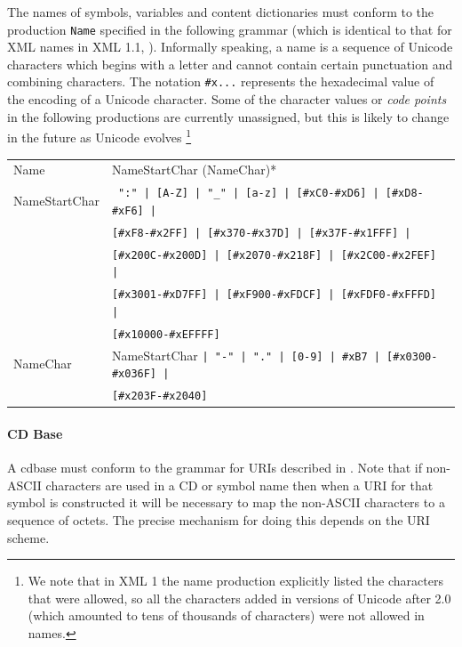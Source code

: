 \documentclass{report}
\def\XML{XML\xspace}
\begin{document}
The names of symbols, variables and content dictionaries must conform to the production
\lstinline|Name| specified in the following grammar (which is identical to that for \XML
names in XML 1.1, \cite{xml_04}). Informally speaking, a name is a sequence of Unicode
\cite{UNICODE} characters which begins with a letter and cannot contain certain
punctuation and combining characters.  The notation \lstinline|#x...| represents the
hexadecimal value of the encoding of a Unicode character.  Some of the character values or
\emph{code points} in the following productions are currently unassigned, but this is
likely to change in the future as Unicode evolves \footnote{\label{xml1} We note that in
  XML 1 the name production explicitly listed the characters that were allowed, so all the
  characters added in versions of Unicode after 2.0 (which amounted to tens of thousands
  of characters) were not allowed in names.}


\begin{center}
\begin{tabular}{l@{$\longrightarrow$}p{10cm}}
Name & NameStartChar (NameChar)* \\
NameStartChar & 
\lstinline? ":" | [A-Z] | "_" | [a-z] | [#xC0-#xD6] | [#xD8-#xF6] |?\\
& \lstinline?[#xF8-#x2FF] | [#x370-#x37D] | [#x37F-#x1FFF] |?\\
& \lstinline?[#x200C-#x200D] | [#x2070-#x218F] | [#x2C00-#x2FEF] |?\\
& \lstinline?[#x3001-#xD7FF] | [#xF900-#xFDCF] | [#xFDF0-#xFFFD] |?\\
& \lstinline?[#x10000-#xEFFFF]? \\
NameChar & 
NameStartChar \lstinline?| "-" | "." | [0-9] | #xB7 | [#x0300-#x036F] |?\\
 & \lstinline?[#x203F-#x2040]? 
\end{tabular}
\end{center}

\paragraph{CD Base}

A cdbase must conform to the grammar for URIs described in
\cite{IETF2396}.  Note that if non-ASCII characters are
used in a CD or symbol name then when a URI for that symbol is
constructed it will be necessary to map the non-ASCII characters to a
sequence of octets.  The precise mechanism for doing this depends on
the URI scheme.
\end{document}
